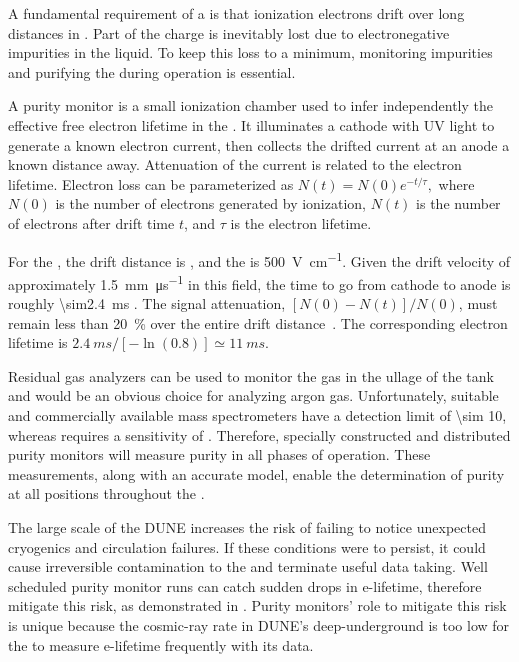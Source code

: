A fundamental requirement of a   is that ionization electrons drift over long distances in . Part of the charge is inevitably lost due to electronegative impurities in the liquid. To keep this loss to a minimum, monitoring impurities and purifying the  during operation is essential.


A purity monitor is a small ionization chamber used to infer independently  the effective free electron lifetime in the .  
It illuminates a cathode with UV light to generate a known electron current, then collects the drifted current at an anode a known distance away.  Attenuation of the current is related to the electron lifetime.
Electron loss can be parameterized as
%
\(N(t) = N(0)e^{-t/\tau},\)
%
where $N(0)$ is the number of electrons generated by ionization, $N(t)$ is the number of electrons after drift time $t$, and $\tau$ is the electron lifetime. 


For the , the drift distance is \spmaxdrift, and the \efield is \SI{500}{\volt\per\centi\meter}. Given the drift velocity of approximately \SI{1.5}{\milli\meter\per\micro\second} in this field, the time to go from cathode to anode is roughly \SI{\sim2.4}{\milli\second} \cite{Walkowiak:2000wf}.
The  signal attenuation, \([N(0)-N(t)]/N(0)\), must remain %
less than \SI{20}{\percent} over the entire drift distance~\cite{bib:docdb3384}.  %
 The corresponding electron lifetime is $\SI{2.4}{ms}/[-\ln(0.8)] \simeq \SI{11}{ms}$.


Residual gas analyzers can be used to monitor the gas in the ullage of the tank and would be an obvious choice for analyzing argon gas. 
Unfortunately, suitable and commercially available mass
spectrometers have a detection limit of \SI{\sim 10}{},
whereas  requires a sensitivity of . Therefore,
specially constructed and distributed purity monitors will measure  purity in all %
phases of operation. %
These measurements,
along with an accurate  model, enable the
determination of purity at all positions throughout the .

The large scale of the DUNE  increases the risk of failing to notice unexpected cryogenics and circulation failures. If these conditions were to persist, it could cause irreversible contamination to the  and terminate useful data taking.  Well scheduled purity monitor runs can catch sudden drops in e-lifetime, therefore mitigate this risk, as demonstrated in . Purity monitors' role to mitigate this risk is unique because the cosmic-ray rate in DUNE's deep-underground  is too low for the  to measure e-lifetime frequently with its data.  


